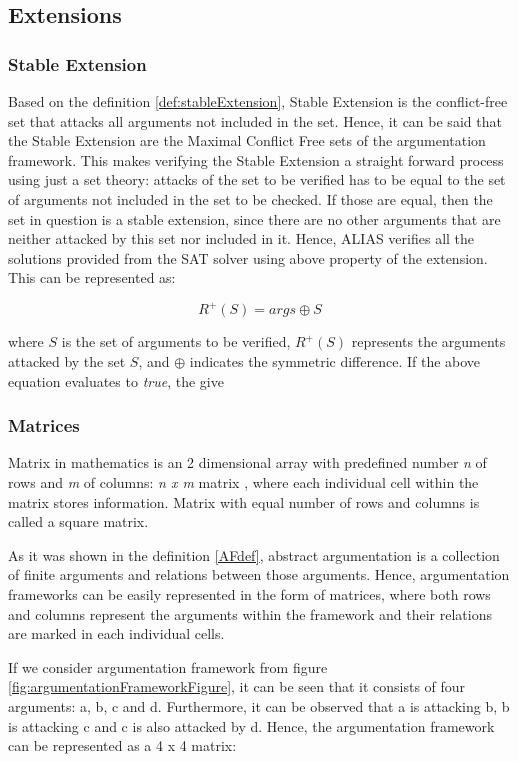 \subsection{Extensions}
\subsubsection{Stable Extension} \label{section:stableExtension}
Based on the definition \ref{def:stableExtension}, Stable Extension is the conflict-free set that attacks all arguments not included in the set. Hence, it can be said that the Stable Extension are the Maximal Conflict Free sets of the argumentation framework. This makes verifying the Stable Extension a straight forward process using just a set theory: attacks of the set to be verified has to be equal to the set of arguments not included in the set to be checked. If those are equal, then the set in question is a stable extension, since there are no other arguments that are neither attacked by this set nor included in it. Hence, ALIAS verifies all the solutions provided from the SAT solver using above property of the extension. This can be represented as: 

\begin{equation}
R^+(S) = args \oplus S
\end{equation}

where $S$ is the set of arguments to be verified, $R^+(S)$ represents the arguments attacked by the set $S$, and $\oplus$ indicates the symmetric difference. If the above equation evaluates to \textit{true}, the give

\subsubsection{Matrices}
Matrix in mathematics is an 2 dimensional array with predefined number \textit{n} of rows and \textit{m} of columns: \textit{n x m} matrix \citep{matrices}, where each individual cell within the matrix stores information. Matrix with equal number of rows and columns is called a square matrix. 

As it was shown in the definition \ref{AFdef}, abstract argumentation is a collection of finite arguments and relations between those arguments. Hence, argumentation frameworks can be easily represented in the form of matrices, where both rows and columns represent the arguments within the framework and their relations are marked in each individual cells. 

If we consider argumentation framework from figure \ref{fig:argumentationFrameworkFigure}, it can be seen that it consists of four arguments: a, b, c and d. Furthermore, it can be observed that a is attacking b, b is attacking c and c is also attacked by d. Hence, the argumentation framework can be represented as a 4 x 4 matrix:

